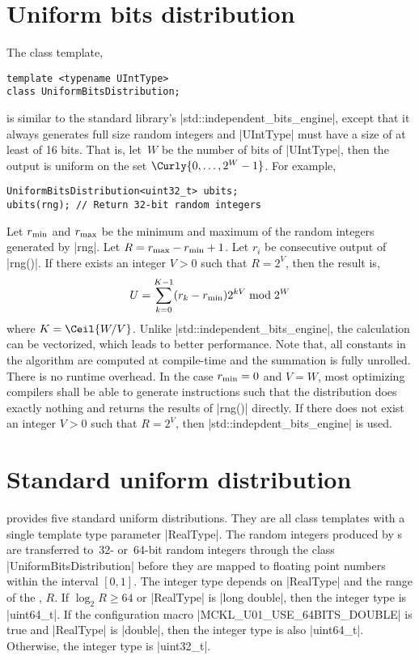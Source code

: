 \section{Uniform bits distribution}
\label{sec:Uniform bits distribution}

The class template,
\begin{verbatim}
template <typename UIntType>
class UniformBitsDistribution;
\end{verbatim}
is similar to the standard library's |std::independent_bits_engine|, except
that it always generates full size random integers and |UIntType| must have
a size of at least of 16 bits. That is, let~$W$ be the number of bits of
|UIntType|, then the output is uniform on the set $\Curly{0,\dots,2^W - 1}$.
For example,
\begin{verbatim}
UniformBitsDistribution<uint32_t> ubits;
ubits(rng); // Return 32-bit random integers
\end{verbatim}
Let $r_{\mathrm{min}}$ and $r_{\mathrm{max}}$ be the minimum and maximum of the random integers
generated by |rng|. Let $R = r_{\mathrm{max}} - r_{\mathrm{min}} + 1$. Let $r_i$ be consecutive
output of |rng()|. If there exists an integer $V > 0$ such that $R = 2^V$, then
the result is,
\begin{equation*}
  U = \sum_{k = 0}^{K - 1} (r_k - r_{\mathrm{min}}) 2^{kV} \bmod 2^W
\end{equation*}
where $K = \Ceil{W / V}$. Unlike |std::independent_bits_engine|, the
calculation can be vectorized, which leads to better performance. Note that,
all constants in the algorithm are computed at compile-time and the summation
is fully unrolled. There is no runtime overhead. In the case $r_{\mathrm{min}} = 0$ and $V
= W$, most optimizing compilers shall be able to generate instructions such
that the distribution does exactly nothing and returns the results of |rng()|
directly. If there does not exist an integer $V > 0$ such that $R = 2^V$, then
|std::indepdent_bits_engine| is used.

\section{Standard uniform distribution}
\label{sec:Standard uniform distribution}

\mckl provides five standard uniform distributions. They are all class
templates with a single template type parameter |RealType|. The random integers
produced by \rng{}s are transferred to~32- or~64-bit random integers through
the class |UniformBitsDistribution| before they are mapped to floating point
numbers within the interval $[0, 1]$. The integer type depends on |RealType|
and the range of the \rng{}, $R$. If $\log_2 R \ge 64$ or |RealType| is
|long double|, then the integer type is |uint64_t|. If the configuration macro
|MCKL_U01_USE_64BITS_DOUBLE| is true and |RealType| is |double|, then the
integer type is also |uint64_t|. Otherwise, the integer type is |uint32_t|.

